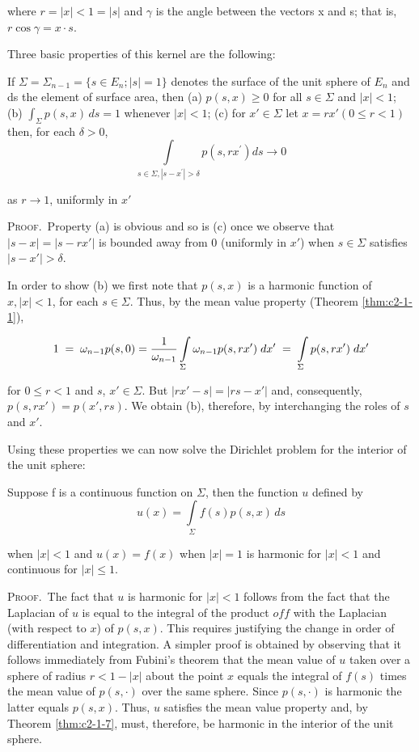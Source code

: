 where $r = |x| < 1 = |s|$ and $\gamma$ is the angle between the vectors x and s; that is, $r \cos \gamma = x \cdot s$.

Three basic properties of this kernel are the following:

\begin{theorem}
\label{thm:c2-1-9}
If $\Sigma = \Sigma_{n-1} = \{s \in E_n; |s| = 1\}$ denotes the surface of the unit sphere of $E_n$ and ds the element of surface area, then
(a) $p(s, x) \geq 0$ for all $s \in \Sigma$ and $|x| < 1$;
(b) $\int_{\Sigma} p(s, x) \, ds = 1$ whenever $|x| < 1$;
(c) for $x' \in \Sigma$ let $x = rx' (0 \leq r < 1)$ then, for each $\delta > 0$,
\[
\int\limits_{s\in\Sigma,|s-x^{\prime}|>\delta}p(s,r x^{\prime}) d s\to0
\]

as $r \to 1$, uniformly in $x'$
\end{theorem}

\textsc{Proof.}\ Property (a) is obvious and so is (c) once we observe that $|s - x| = |s - rx'|$ is bounded away from 0 (uniformly in $x'$) when $s \in \Sigma$ satisfies $|s - x'| > \delta$.

In order to show (b) we first note that $p(s, x)$ is a harmonic function of $x, |x| < 1$, for each $s \in \Sigma$. Thus, by the mean value property (Theorem \ref{thm:c2-1-1}),

\[
1\;=\;\omega_{n-1}p(s,0)=\frac{1}{\omega_{n-1}}\intop_{\Sigma}\omega_{n-1}p(s,r x^{\prime})\;d x^{\prime}\;=\;\intop_{\Sigma}p(s,r x^{\prime})\;d x^{\prime}
\]

for $0 \leq r < 1$ and $s$, $x' \in \Sigma$. But $|rx' - s| = |rs - x'|$ and, consequently, $p(s, rx') = p(x', rs)$. We obtain (b), therefore, by interchanging the roles of $s$ and $x'$.

Using these properties we can now solve the Dirichlet problem for the interior of the unit sphere:

\begin{theorem}
\label{thm:c2-1-10}
Suppose f is a continuous function on $\Sigma$, then the function $u$ defined by
\[
u(x)=\int\limits_{\Sigma}f(s)p(s,x)\,ds
\]

when $|x| < 1$ and $u(x) = f(x)$ when $|x| = 1$ is harmonic for $|x| < 1$ and continuous for $|x| \leq 1$.
\end{theorem}

\textsc{Proof.}\ The fact that $u$ is harmonic for $|x|<1$ follows from the fact that the Laplacian of $u$ is equal to the integral of the product $of f$ with the Laplacian (with respect to $x$) of $p(s,x)$. This requires justifying the change in order of differentiation and integration. A simpler proof is obtained by observing that it follows immediately from Fubini's theorem that the mean value of $u$ taken over a sphere of radius $r<1-|x|$ about the point $x$ equals the integral of $f(s)$ times the mean value of $p(s,\cdot)$ over the same sphere. Since $p(s,\cdot)$ is harmonic the latter equals $p(s,x)$. Thus, $u$ satisfies the mean value property and, by Theorem \ref{thm:c2-1-7}, must, therefore, be harmonic in the interior of the unit sphere.

